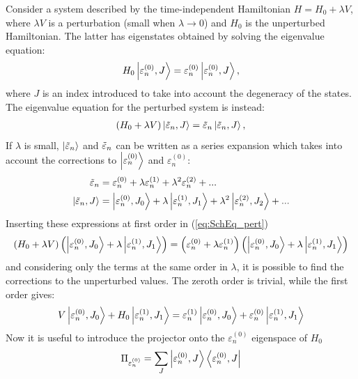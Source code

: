 Consider a system described by the time-independent Hamiltonian $H = H_0 + \lambda V$, where $\lambda V$ is a perturbation (small when $\lambda \to 0$) and $H_0$ is the unperturbed Hamiltonian. The latter has eigenstates obtained by solving the eigenvalue equation: 
\begin{align*}
    H_0 \ket{\varepsilon^{(0)}_n, J} = \varepsilon^{(0)}_n \ket{\varepsilon^{(0)}_n, J}, 
\end{align*}
where $J$ is an index introduced to take into account the degeneracy of the states. 
The eigenvalue equation for the perturbed system is instead: 
\begin{align}
    \label{eq:SchEq_pert}
    (H_0 + \lambda V) \ket{\Tilde{\varepsilon}_n,J}= \Tilde{\varepsilon}_n \ket{\Tilde{\varepsilon}_n,J}, 
\end{align}
If $\lambda$ is small, $\ket{\Tilde{\varepsilon}_n}$ and $\Tilde{\varepsilon}_n$ can be written as a series expansion which takes into account the corrections to $\ket{\varepsilon^{(0)}_n}$ and $\varepsilon^{(0)}_n$:
\begin{align*}
    \Tilde{\varepsilon}_n &= \varepsilon^{(0)}_n + \lambda \varepsilon^{(1)}_n + \lambda^2 \varepsilon^{(2)}_n + ... \\
    \ket{\Tilde{\varepsilon}_n,J} &= \ket{\varepsilon^{(0)}_n,J_0} + \lambda \ket{\varepsilon^{(1)}_n,J_1} + \lambda^2 \ket{\varepsilon^{(2)}_n,J_2} + ...
\end{align*}
Inserting these expressions at first order in (\ref{eq:SchEq_pert})
\begin{align*}
    (H_0 + \lambda V) \left(\ket{\varepsilon^{(0)}_n,J_0} + \lambda \ket{\varepsilon^{(1)}_n,J_1} \right) = \left( \varepsilon^{(0)}_n + \lambda \varepsilon^{(1)}_n \right)\left(\ket{\varepsilon^{(0)}_n,J_0} + \lambda \ket{\varepsilon^{(1)}_n,J_1} \right)
\end{align*}
and considering only the terms at the same order in $\lambda$, it is possible to find the corrections to the unperturbed values. The zeroth order is trivial, while the first order gives:
\begin{align}
    \label{eq:fo_pert1}
    V \ket{\varepsilon^{(0)}_n,J_0} + H_0 \ket{\varepsilon^{(1)}_n,J_1} = \varepsilon^{(1)}_n \ket{\varepsilon^{(0)}_n,J_0} + \varepsilon^{(0)}_n \ket{\varepsilon^{(1)}_n,J_1}
\end{align}
Now it is useful to introduce the projector onto the $\varepsilon^{(0)}_n$ eigenspace of $H_0$
\begin{align*}
    \Pi_{\varepsilon^{(0)}_n} = \sum_{J} \ket{\varepsilon^{(0)}_n, J} \bra{\varepsilon^{(0)}_n, J}
\end{align*}
